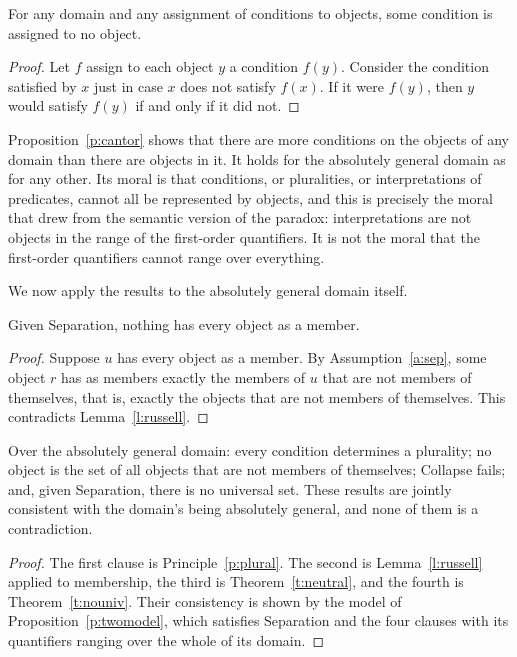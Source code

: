 \documentclass{situationist-preprint}
\begin{document}
\begin{proposition}[Cantor]\label{p:cantor}
For any domain and any assignment of conditions to objects, some condition is assigned to no object.
\end{proposition}

\begin{proof}
Let $f$ assign to each object $y$ a condition $f(y)$. Consider the condition satisfied by $x$ just in case $x$ does not satisfy $f(x)$. If it were $f(y)$, then $y$ would satisfy $f(y)$ if and only if it did not.
\end{proof}

Proposition~\ref{p:cantor} shows that there are more conditions on the objects of any domain than there are objects in it. It holds for the absolutely general domain as for any other. Its moral is that conditions, or pluralities, or interpretations of predicates, cannot all be represented by objects, and this is precisely the moral that \citet{Williamson2003} drew from the semantic version of the paradox: interpretations are not objects in the range of the first-order quantifiers. It is not the moral that the first-order quantifiers cannot range over everything.

We now apply the results to the absolutely general domain itself.

\begin{theorem}\label{t:nouniv}
Given Separation, nothing has every object as a member.
\end{theorem}

\begin{proof}
Suppose $u$ has every object as a member. By Assumption~\ref{a:sep}, some object $r$ has as members exactly the members of $u$ that are not members of themselves, that is, exactly the objects that are not members of themselves. This contradicts Lemma~\ref{l:russell}.
\end{proof}

\begin{theorem}\label{t:main}
Over the absolutely general domain: every condition determines a plurality; no object is the set of all objects that are not members of themselves; Collapse fails; and, given Separation, there is no universal set. These results are jointly consistent with the domain's being absolutely general, and none of them is a contradiction.
\end{theorem}

\begin{proof}
The first clause is Principle~\ref{p:plural}. The second is Lemma~\ref{l:russell} applied to membership, the third is Theorem~\ref{t:neutral}, and the fourth is Theorem~\ref{t:nouniv}. Their consistency is shown by the model of Proposition~\ref{p:twomodel}, which satisfies Separation and the four clauses with its quantifiers ranging over the whole of its domain.
\end{proof}
\end{document}
